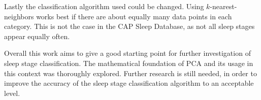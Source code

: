 \newpage
Lastly the classification algorithm used could be changed. Using $k$-nearest-neighbors works best if there are about equally many data points in each category. This is not the case in the CAP Sleep Database, as not all sleep stages appear equally often.

Overall this work aims to give a good starting point for further investigation of sleep stage classification. \color{change} The mathematical foundation of PCA and its usage in this context was thoroughly explored. Further research is still needed, in order to improve the accuracy of the sleep stage classification algorithm to an acceptable level. \color{black}